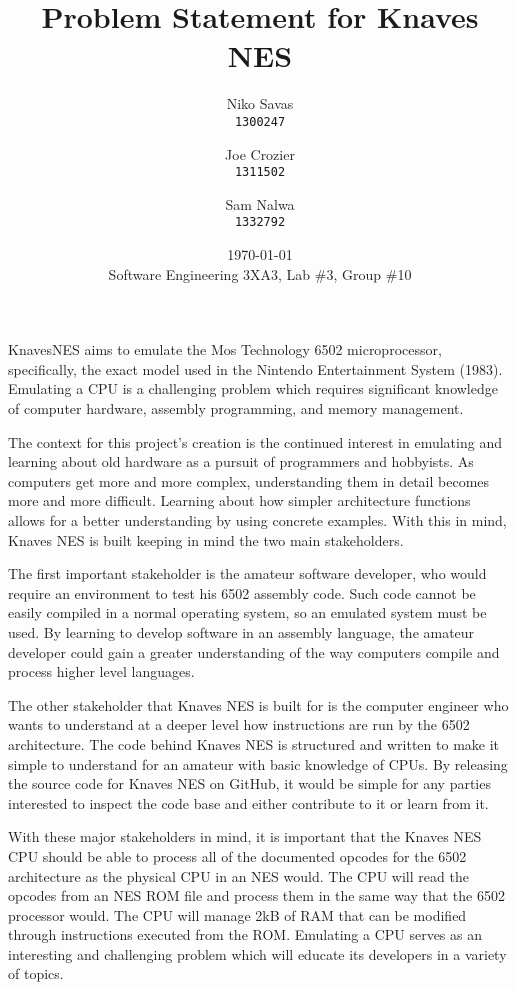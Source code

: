 \documentclass[12pt]{article}
\begin{document}
\title{Problem Statement for Knaves NES}
\date{\today\\
	{\medskip\small Software Engineering 3XA3, Lab \#3, Group \#10}
}
\author{Niko Savas\\
	\texttt{1300247}
	\and
	Joe Crozier\\
	\texttt{1311502}
	\and
	Sam Nalwa\\
	\texttt{1332792}
}
	
\maketitle

KnavesNES aims to emulate the Mos Technology 6502 microprocessor, specifically, the exact model used in the Nintendo Entertainment System (1983). Emulating a CPU is a challenging problem which requires significant knowledge of computer hardware, assembly programming, and memory management.

The context for this project's creation is the continued interest in emulating and learning about old hardware as a pursuit of programmers and hobbyists. As computers get more and more complex, understanding them in detail becomes more and more difficult. Learning about how simpler architecture functions allows for a better understanding by using concrete examples. With this in mind, Knaves NES is built keeping in mind the two main stakeholders.

The first important stakeholder is the amateur software developer, who would require an environment to test his 6502 assembly code. Such code cannot be easily compiled in a normal operating system, so an emulated system must be used. By learning to develop software in an assembly language, the amateur developer could gain a greater understanding of the way computers compile and process higher level languages.

The other stakeholder that Knaves NES is built for is the computer engineer who wants to understand at a deeper level how instructions are run by the 6502 architecture. The code behind Knaves NES is structured and written to make it simple to understand for an amateur with basic knowledge of CPUs. By releasing the source code for Knaves NES on GitHub, it would be simple for any parties interested to inspect the code base and either contribute to it or learn from it.

With these major stakeholders in mind, it is important that the Knaves NES CPU should be able to process all of the documented opcodes for the 6502 architecture as the physical CPU in an NES would. The CPU will read the opcodes from an NES ROM file and process them in the same way that the 6502 processor would. The CPU will manage 2kB of RAM that can be modified through instructions executed from the ROM. Emulating a CPU serves as an interesting and challenging problem which will educate its developers in a variety of topics.
\end{document}
